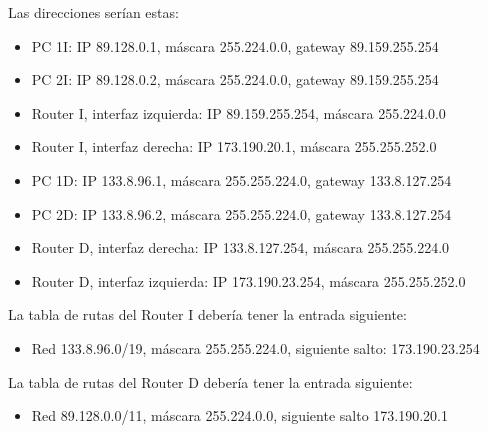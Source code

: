 \documentclass[letterpaper,10pt,spanish]{sphinxmanual}
\begin{document}
\sphinxAtStartPar
Las direcciones serían estas:
\begin{itemize}
\item {} 
\sphinxAtStartPar
PC 1I: IP 89.128.0.1, máscara 255.224.0.0, gateway 89.159.255.254

\item {} 
\sphinxAtStartPar
PC 2I: IP 89.128.0.2, máscara 255.224.0.0, gateway 89.159.255.254

\item {} 
\sphinxAtStartPar
Router I, interfaz izquierda: IP 89.159.255.254, máscara 255.224.0.0

\item {} 
\sphinxAtStartPar
Router I, interfaz derecha: IP 173.190.20.1, máscara 255.255.252.0

\item {} 
\sphinxAtStartPar
PC 1D: IP 133.8.96.1, máscara 255.255.224.0, gateway 133.8.127.254

\item {} 
\sphinxAtStartPar
PC 2D: IP 133.8.96.2, máscara 255.255.224.0, gateway 133.8.127.254

\item {} 
\sphinxAtStartPar
Router D, interfaz derecha: IP 133.8.127.254, máscara 255.255.224.0

\item {} 
\sphinxAtStartPar
Router D, interfaz izquierda: IP 173.190.23.254, máscara 255.255.252.0

\end{itemize}

\sphinxAtStartPar
La tabla de rutas del Router I debería tener la entrada siguiente:
\begin{itemize}
\item {} 
\sphinxAtStartPar
Red 133.8.96.0/19, máscara 255.255.224.0, siguiente salto: 173.190.23.254

\end{itemize}

\sphinxAtStartPar
La tabla de rutas del Router D debería tener la entrada siguiente:
\begin{itemize}
\item {} 
\sphinxAtStartPar
Red 89.128.0.0/11, máscara 255.224.0.0, siguiente salto 173.190.20.1

\end{itemize}
\end{document}
